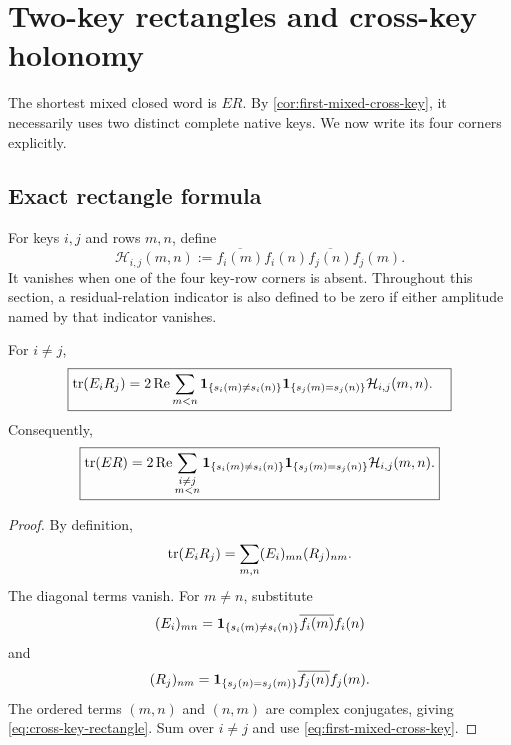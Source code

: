 \section{Two-key rectangles and cross-key holonomy}
\label{sec:cross-key}

The shortest mixed closed word is \(ER\).  By
\cref{cor:first-mixed-cross-key}, it necessarily uses two distinct complete
native keys.  We now write its four corners explicitly.

\subsection{Exact rectangle formula}

For keys \(i,j\) and rows \(m,n\), define
\begin{equation}
 \mathcal H_{i,j}(m,n)
 :=
 \overline{f_i(m)}f_i(n)
 \overline{f_j(n)}f_j(m).
 \label{eq:rectangle-holonomy}
\end{equation}
It vanishes when one of the four key-row corners is absent.
Throughout this section, a residual-relation indicator is also defined to
be zero if either amplitude named by that indicator vanishes.

\begin{theorem}
\label{thm:cross-key-rectangle}
For \(i\ne j\),
\begin{equation}
\boxed{
\begin{aligned}
\operatorname{tr}(E_iR_j)
={}&
2\operatorname{Re}
\sum_{m<n}
\mathbf 1_{\{s_i(m)\ne s_i(n)\}}
\mathbf 1_{\{s_j(m)=s_j(n)\}}
\mathcal H_{i,j}(m,n).
\end{aligned}}
\label{eq:cross-key-rectangle}
\end{equation}
Consequently,
\begin{equation}
\boxed{
\operatorname{tr}(ER)
=
2\operatorname{Re}
\sum_{\substack{i\ne j\\m<n}}
\mathbf 1_{\{s_i(m)\ne s_i(n)\}}
\mathbf 1_{\{s_j(m)=s_j(n)\}}
\mathcal H_{i,j}(m,n).}
\label{eq:full-cross-key-rectangle}
\end{equation}
\end{theorem}

\begin{proof}
By definition,
\[
 \operatorname{tr}(E_iR_j)
 =
 \sum_{m,n}(E_i)_{mn}(R_j)_{nm}.
\]
The diagonal terms vanish.  For \(m\ne n\), substitute
\[
 (E_i)_{mn}
 =
 \mathbf 1_{\{s_i(m)\ne s_i(n)\}}
 \overline{f_i(m)}f_i(n)
\]
and
\[
 (R_j)_{nm}
 =
 \mathbf 1_{\{s_j(n)=s_j(m)\}}
 \overline{f_j(n)}f_j(m).
\]
The ordered terms \((m,n)\) and \((n,m)\) are complex conjugates, giving
\eqref{eq:cross-key-rectangle}.  Sum over \(i\ne j\) and use
\eqref{eq:first-mixed-cross-key}.
\end{proof}

